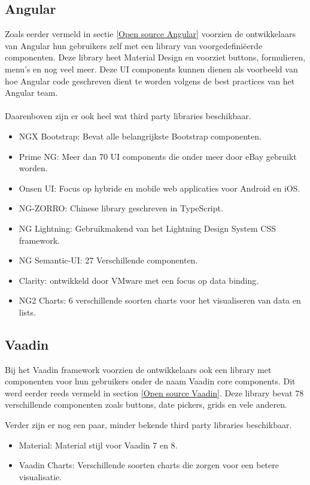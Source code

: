 \subsection{Angular}
Zoals eerder vermeld in sectie \ref{Open source Angular} voorzien de ontwikkelaars van Angular hun gebruikers zelf met een library van voorgedefiniëerde componenten. Deze library heet Material Design en voorziet buttons, formulieren, menu's en nog veel meer. Deze UI components kunnen dienen als voorbeeld van hoe Angular code geschreven dient te worden volgens de best practices van het Angular team.
\\ \\
Daarenboven zijn er ook heel wat third party libraries beschikbaar. 
\begin{itemize}
	\item NGX Bootstrap: Bevat alle belangrijkste Bootstrap componenten.
	\item Prime NG: Meer dan 70 UI components die onder meer door eBay gebruikt worden. 
	\item Onsen UI: Focus op hybride en mobile web applicaties voor Android en iOS.
	\item NG-ZORRO: Chinese library geschreven in TypeScript.
	\item NG Lightning: Gebruikmakend van het Lightning Design System CSS framework.
	\item NG Semantic-UI: 27 Verschillende componenten.
	\item Clarity: ontwikkeld door VMware met een focus op data binding.
	\item NG2 Charts: 6 verschillende soorten charts voor het visualiseren van data en lists.
\end{itemize}

\subsection{Vaadin}
Bij het Vaadin framework voorzien de ontwikkelaars ook een library met componenten voor hun gebruikers onder de naam Vaadin core components. Dit werd eerder reeds vermeld in section \ref{Open source Vaadin}. Deze library bevat 78 verschillende componenten zoals buttons, date pickers, grids en vele anderen. 

Verder zijn er nog een paar, minder bekende third party libraries beschikbaar.
\begin{itemize}
	\item Material: Material stijl voor Vaadin 7 en 8.
	\item Vaadin Charts: Verschillende soorten charts die zorgen voor een betere visualisatie. 
\end{itemize}

